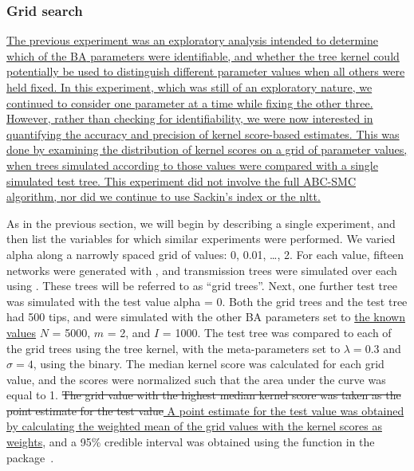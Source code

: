 \subsubsection*{Grid search}

{\color{blue}\uline{The previous experiment was an exploratory analysis
intended to determine which of the \gls{BA} parameters were identifiable, and
whether the tree kernel could potentially be used to distinguish different
parameter values when all others were held fixed. In this experiment, which was
still of an exploratory nature, we continued to consider one parameter at a
time while fixing the other three. However, rather than checking for
identifiability, we were now interested in quantifying the accuracy and
precision of kernel score-based estimates. This was done by examining the
distribution of kernel scores on a grid of parameter values, when trees
simulated according to those values were compared with a single simulated test
tree. This experiment did not involve the full \gls{ABC}-\gls{SMC} algorithm,
nor did we continue to use Sackin's index or the \gls{nltt}.}}

As in the previous section, we will begin by describing a single experiment,
and then list the variables for which similar experiments were performed. We
varied \gls{alpha} along a narrowly spaced grid of values: 0, 0.01, \ldots, 2.
For each value, fifteen networks were generated with , and
transmission trees were simulated over each using . These
trees will be referred to as ``grid trees''. Next, one further test tree was
simulated with the test value \gls{alpha} = 0. Both the grid trees and the test
tree had 500 tips, and were simulated with the other \gls{BA} parameters set to
{\color{blue}\uline{the known values}} $N$ = 5000, $m$ = 2, and $I$ = 1000. The
test tree was compared to each of the grid trees using the tree kernel, with
the meta-parameters set to $\lambda = 0.3$ and $\sigma = 4$, using the
 binary. The median kernel score was calculated for each
grid value, and the scores were normalized such that the area under the curve
was equal to 1. {\color{red}\sout{The grid value with the highest median kernel
score was taken as the point estimate for the test value}}{\color{blue}\uline{
A point estimate for the test value was obtained by calculating the weighted
mean of the grid values with the kernel scores as weights}}, and a 95\%
credible interval was obtained using the  function in the
 package~\autocite{snow2013teachingdemos}.


